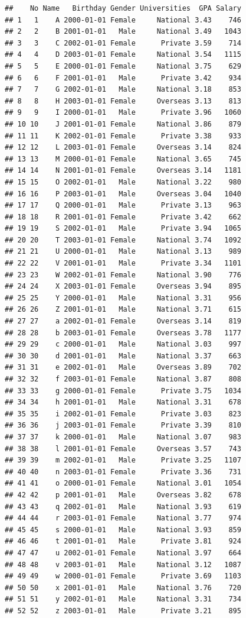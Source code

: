 \documentclass[
]{book}
\begin{document}
\begin{verbatim}
##    No Name   Birthday Gender Universities  GPA Salary
## 1   1    A 2000-01-01 Female     National 3.43    746
## 2   2    B 2001-01-01   Male     National 3.49   1043
## 3   3    C 2002-01-01 Female      Private 3.59    714
## 4   4    D 2003-01-01 Female     National 3.54   1115
## 5   5    E 2000-01-01 Female     National 3.75    629
## 6   6    F 2001-01-01   Male      Private 3.42    934
## 7   7    G 2002-01-01   Male     National 3.18    853
## 8   8    H 2003-01-01 Female     Overseas 3.13    813
## 9   9    I 2000-01-01   Male      Private 3.96   1060
## 10 10    J 2001-01-01 Female     National 3.86    879
## 11 11    K 2002-01-01 Female      Private 3.38    933
## 12 12    L 2003-01-01 Female     Overseas 3.14    824
## 13 13    M 2000-01-01 Female     National 3.65    745
## 14 14    N 2001-01-01 Female     Overseas 3.14   1181
## 15 15    O 2002-01-01   Male     National 3.22    980
## 16 16    P 2003-01-01   Male     Overseas 3.04   1040
## 17 17    Q 2000-01-01   Male      Private 3.13    963
## 18 18    R 2001-01-01 Female      Private 3.42    662
## 19 19    S 2002-01-01   Male      Private 3.94   1065
## 20 20    T 2003-01-01 Female     National 3.74   1092
## 21 21    U 2000-01-01   Male     National 3.13    989
## 22 22    V 2001-01-01   Male      Private 3.34   1101
## 23 23    W 2002-01-01 Female     National 3.90    776
## 24 24    X 2003-01-01 Female     Overseas 3.94    895
## 25 25    Y 2000-01-01   Male     National 3.31    956
## 26 26    Z 2001-01-01   Male     National 3.71    615
## 27 27    a 2002-01-01 Female     Overseas 3.14    819
## 28 28    b 2003-01-01 Female     Overseas 3.78   1177
## 29 29    c 2000-01-01   Male     National 3.03    997
## 30 30    d 2001-01-01   Male     National 3.37    663
## 31 31    e 2002-01-01   Male     Overseas 3.89    702
## 32 32    f 2003-01-01 Female     National 3.87    808
## 33 33    g 2000-01-01 Female      Private 3.75   1034
## 34 34    h 2001-01-01   Male     National 3.31    678
## 35 35    i 2002-01-01 Female      Private 3.03    823
## 36 36    j 2003-01-01 Female      Private 3.39    810
## 37 37    k 2000-01-01   Male     National 3.07    983
## 38 38    l 2001-01-01 Female     Overseas 3.57    743
## 39 39    m 2002-01-01   Male      Private 3.25   1107
## 40 40    n 2003-01-01 Female      Private 3.36    731
## 41 41    o 2000-01-01 Female     National 3.01   1054
## 42 42    p 2001-01-01   Male     Overseas 3.82    678
## 43 43    q 2002-01-01   Male     National 3.93    619
## 44 44    r 2003-01-01 Female     National 3.77    974
## 45 45    s 2000-01-01   Male     National 3.93    859
## 46 46    t 2001-01-01   Male      Private 3.81    924
## 47 47    u 2002-01-01 Female     National 3.97    664
## 48 48    v 2003-01-01   Male     National 3.12   1087
## 49 49    w 2000-01-01 Female      Private 3.69   1103
## 50 50    x 2001-01-01   Male     National 3.76    720
## 51 51    y 2002-01-01   Male     National 3.31    734
## 52 52    z 2003-01-01   Male      Private 3.21    895
\end{verbatim}
\end{document}
